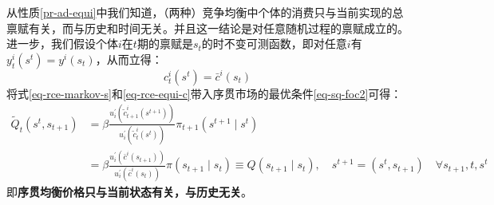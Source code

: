 从性质\ref{pr-ad-equi}中我们知道，（两种）竞争均衡中个体的消费只与当前实现的总禀赋有关，而与历史和时间无关。并且这一结论是对任意随机过程的禀赋成立的。
进一步，我们假设个体$i$在$t$期的禀赋是$s_t$的时不变可测函数，即对任意$i$有$y_t^i\left(s^t\right)=y^i\left(s_t\right)$，从而立得：
\begin{equation}    \label{eq-rce-equi-c}
    c_t^i\left(s^t\right) = \bar{c}^i\left(s_t\right)
\end{equation}
将式\ref{eq-rce-markov-s}和\ref{eq-rce-equi-c}带入序贯市场的最优条件\ref{eq-sq-foc2}可得：
\begin{equation}    \label{eq-rce-foc}
    \begin{aligned}
        \tilde{Q}_t\left(s^t, s_{t+1}\right) 
        &= \beta \frac{u_i^{\prime}\left(\tilde{c}_{t+1}^i\left(s^{t+1}\right)\right)}
                    {u_i^{\prime}\left(\tilde{c}_t^i\left(s^t\right)\right)} \pi_{t+1}\left(s^{t+1} \mid s^t\right) \\
        &= \beta \frac{u_i^{\prime}\left(\bar{c}^i\left(s_{t+1}\right)\right)}{u_i^{\prime}\left(\bar{c}^i\left(s_t\right)\right)} 
            \pi\left(s_{t+1} \mid s_t\right) \equiv Q\left(s_{t+1} \mid s_t\right), 
                \quad s^{t+1}=(s^t,s_{t+1}) \quad \forall s_{t+1}, t, s^t        
    \end{aligned}
\end{equation}
即\textbf{序贯均衡价格只与当前状态有关，与历史无关}。

